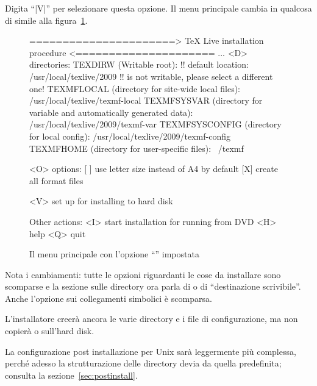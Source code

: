 \documentclass{article}
\begin{document}
Digita ``|V|'' per selezionare questa opzione. Il menu principale cambia
in qualcosa di simile alla figura~\ref{fig:main-fromdvd}.

\begin{figure}[tbh]
\begin{boxedverbatim}
======================> TeX Live installation procedure <=====================
...
 <D> directories:
   TEXDIRW (Writable root):
     !! default location: /usr/local/texlive/2009
     !! is not writable, please select a different one!
   TEXMFLOCAL (directory for site-wide local files):
     /usr/local/texlive/texmf-local
   TEXMFSYSVAR (directory for variable and automatically generated data):
     /usr/local/texlive/2009/texmf-var
   TEXMFSYSCONFIG (directory for local config):
     /usr/local/texlive/2009/texmf-config
   TEXMFHOME (directory for user-specific files):
     ~/texmf

 <O> options:
   [ ] use letter size instead of A4 by default
   [X] create all format files

 <V> set up for installing to hard disk

Other actions:
 <I> start installation for running from DVD
 <H> help
 <Q> quit
\end{boxedverbatim}
\caption{Il menu principale con l'opzione ``'' impostata}
\label{fig:main-fromdvd}
\end{figure}

Nota i cambiamenti: tutte le opzioni riguardanti le cose da installare
sono scomparse e la sezione sulle directory ora parla di 
o di ``destinazione scrivibile''. Anche l'opzione sui collegamenti
simbolici è scomparsa.

L'installatore creerà ancora le varie directory e i file di
configurazione, ma non copierà  o 
sull'hard disk.

La configurazione post installazione per Unix sarà leggermente più
complessa, perché adesso la strutturazione delle directory devia da quella
predefinita; consulta la sezione~\ref{sec:postinstall}.
\end{document}
